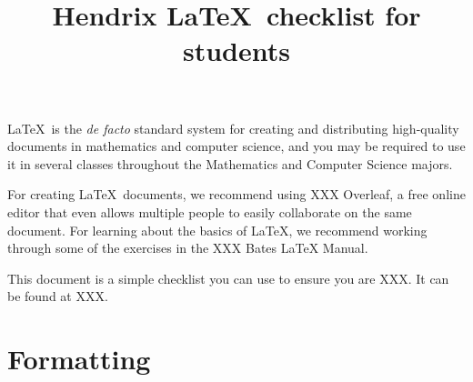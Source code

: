 \documentclass{article}
\title{Hendrix \protect\LaTeX\ checklist for students}
\date{}
\begin{document}
\maketitle
\def\arraystretch{1.5}

\LaTeX\ is the \emph{de facto} standard system for creating and
distributing high-quality documents in mathematics and computer
science, and you may be required to use it in several classes
throughout the Mathematics and Computer Science majors.

For creating \LaTeX\ documents, we recommend using XXX Overleaf, a
free online editor that even allows multiple people to easily
collaborate on the same document.  For learning about the basics of
\LaTeX, we recommend working through some of the exercises in the XXX
Bates LaTeX Manual.

This document is a simple checklist you can use to ensure you are
XXX.  It can be found at XXX.

\section*{Formatting}
\label{sec:formatting}
\end{document}
